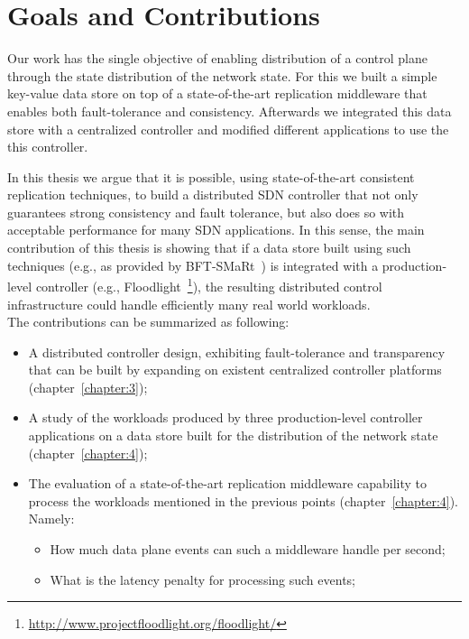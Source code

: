 \section{Goals and Contributions}
Our work has the single objective of enabling distribution of a control plane through the state distribution of the network state. 
For this we built a simple key-value data store on top of a state-of-the-art replication middleware that enables both fault-tolerance and consistency. 
Afterwards we integrated this data store with a centralized controller and modified different applications to use the this controller. 

In this thesis we argue that it is possible, using state-of-the-art consistent replication techniques, to build a distributed SDN controller that not only guarantees strong consistency and fault tolerance, but also does so with acceptable performance for many SDN applications.
In this sense, the main contribution of this thesis is showing that if a data store built using such techniques (e.g., as provided by BFT-SMaRt~\cite{smart-tr}) is integrated with a production-level controller (e.g., Floodlight~\footnote{\url{http://www.projectfloodlight.org/floodlight/}}), the resulting distributed control infrastructure could handle efficiently many real world workloads.\\


The contributions can be summarized as following: 
\begin{itemize}
\item A distributed controller design, exhibiting fault-tolerance and transparency that can be built by expanding on existent centralized controller platforms (chapter~\ref{chapter:3});
\item A study of the workloads produced by three production-level controller applications on a data store built for the distribution of the network state (chapter~\ref{chapter:4}); 
\item The evaluation of  a state-of-the-art replication middleware capability to process the workloads mentioned in the previous points (chapter~\ref{chapter:4}). Namely: 
  \begin{itemize}
  \item How much data plane events can such a middleware handle per second; 
  \item What is the latency penalty for processing such events; 
  \end{itemize}
\end{itemize}

